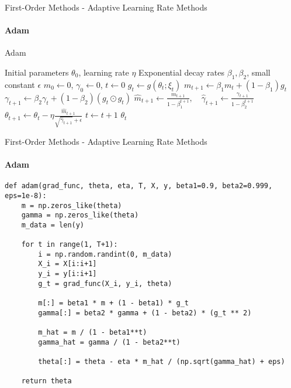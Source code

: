 \documentclass{beamer}
\begin{document}
\begin{frame}[fragile]{First-Order Methods - Adaptive Learning Rate Methods}
\framesubtitle{Adam}
\small
\begin{algorithm}[H]
\caption{Adam}
\begin{algorithmic}[1]
\Require Initial parameters $\theta_0$, learning rate $\eta$
\Require Exponential decay rates $\beta_1, \beta_2$, small constant $\epsilon$
\State $m_0 \gets 0$, $\gamma_0 \gets 0$, $t \gets 0$ 
    \State $g_t \gets g(\theta_t; \xi_t)$ 
    \State $m_{t+1} \gets \beta_1 m_t + (1-\beta_1) g_t$ 
    \State $\gamma_{t+1} \gets \beta_2 \gamma_t + (1-\beta_2) (g_t \odot g_t)$ 
    \State $\hat{m}_{t+1} \gets \frac{m_{t+1}}{1 - \beta_1^{t+1}}, \quad \hat{\gamma}_{t+1} \gets \frac{\gamma_{t+1}}{1 - \beta_2^{t+1}}$ 
    \State $\theta_{t+1} \gets \theta_t - \eta \frac{\hat{m}_{t+1}}{\sqrt{\hat{\gamma}_{t+1}} + \epsilon}$ 
    \State $t \gets t + 1$ 
\EndWhile
\State \Return $\theta_t$
\end{algorithmic}
\end{algorithm}
\end{frame}


\begin{frame}[fragile]{First-Order Methods - Adaptive Learning Rate Methods}
\framesubtitle{Adam}
\begin{verbatim}
def adam(grad_func, theta, eta, T, X, y, beta1=0.9, beta2=0.999, eps=1e-8):
    m = np.zeros_like(theta)
    gamma = np.zeros_like(theta)
    m_data = len(y)

    for t in range(1, T+1):
        i = np.random.randint(0, m_data)
        X_i = X[i:i+1]
        y_i = y[i:i+1]
        g_t = grad_func(X_i, y_i, theta)

        m[:] = beta1 * m + (1 - beta1) * g_t
        gamma[:] = beta2 * gamma + (1 - beta2) * (g_t ** 2)

        m_hat = m / (1 - beta1**t)
        gamma_hat = gamma / (1 - beta2**t)

        theta[:] = theta - eta * m_hat / (np.sqrt(gamma_hat) + eps)

    return theta


\end{verbatim}
\end{frame}
\end{document}
